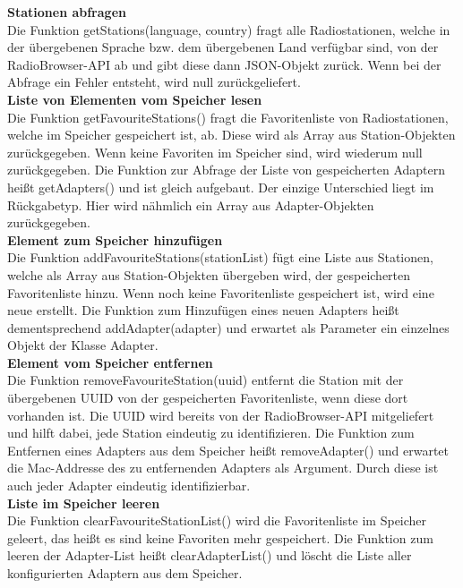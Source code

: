 \documentclass[]{article}
\begin{document}
\textbf{Stationen abfragen} \\
Die Funktion getStations(language, country) fragt alle Radiostationen, welche in der übergebenen Sprache bzw. dem übergebenen Land verfügbar sind, von der RadioBrowser-API ab und gibt diese dann JSON-Objekt zurück. Wenn bei der Abfrage ein Fehler entsteht, wird null zurückgeliefert. \newline \\
\textbf{Liste von Elementen vom Speicher lesen} \\
Die Funktion getFavouriteStations() fragt die Favoritenliste von Radiostationen, welche im Speicher gespeichert ist, ab. Diese wird als Array aus Station-Objekten zurückgegeben. Wenn keine Favoriten im Speicher sind, wird wiederum null zurückgegeben. Die Funktion zur Abfrage der Liste von gespeicherten Adaptern heißt getAdapters() und ist gleich aufgebaut. Der einzige Unterschied liegt im Rückgabetyp. Hier wird nähmlich ein Array aus Adapter-Objekten zurückgegeben.
\newline \\
\textbf{Element zum Speicher hinzufügen} \\
Die Funktion addFavouriteStations(stationList) fügt eine Liste aus Stationen, welche als Array aus Station-Objekten übergeben wird, der gespeicherten Favoritenliste hinzu. Wenn noch keine Favoritenliste gespeichert ist, wird eine neue erstellt. Die Funktion zum Hinzufügen eines neuen Adapters heißt dementsprechend addAdapter(adapter) und erwartet als Parameter ein einzelnes Objekt der Klasse Adapter.
\newline \\
\textbf{Element vom Speicher entfernen} \\
Die Funktion removeFavouriteStation(uuid) entfernt die Station mit der übergebenen UUID von der gespeicherten Favoritenliste, wenn diese dort vorhanden ist. Die UUID wird bereits von der RadioBrowser-API mitgeliefert und hilft dabei, jede Station eindeutig zu identifizieren. Die Funktion zum Entfernen eines Adapters aus dem Speicher heißt removeAdapter() und erwartet die Mac-Addresse des zu entfernenden Adapters als Argument. Durch diese ist auch jeder Adapter eindeutig identifizierbar. \newline \\
\textbf{Liste im Speicher leeren} \\
Die Funktion clearFavouriteStationList() wird die Favoritenliste im Speicher geleert, das heißt es sind keine Favoriten mehr gespeichert. Die Funktion zum leeren der Adapter-List heißt clearAdapterList() und löscht die Liste aller konfigurierten Adaptern aus dem Speicher. \newline \\ 
\end{document}
